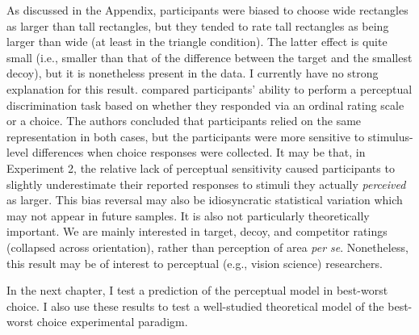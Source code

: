 As discussed in the Appendix, participants were biased to choose wide rectangles as larger than tall rectangles, but they tended to rate tall rectangles as being larger than wide (at least in the triangle condition). The latter effect is quite small (i.e., smaller than that of the difference between the target and the smallest decoy), but it is nonetheless present in the data. I currently have no strong explanation for this result. \textcite{gronau2023choice} compared participants' ability to perform a perceptual discrimination task based on whether they responded via an ordinal rating scale or a choice. The authors concluded that participants relied on the same representation in both cases, but the participants were more sensitive to stimulus-level differences when choice responses were collected. It may be that, in Experiment 2, the relative lack of perceptual sensitivity caused participants to slightly underestimate their reported responses to stimuli they actually \textit{perceived} as larger. This bias reversal may also be idiosyncratic statistical variation which may not appear in future samples. It is also not particularly theoretically important. We are mainly interested in target, decoy, and competitor ratings (collapsed across orientation), rather than perception of area \textit{per se}. Nonetheless, this result may be of interest to perceptual (e.g., vision science) researchers.

In the next chapter, I test a prediction of the perceptual model in best-worst choice. I also use these results to test a well-studied theoretical model of the best-worst choice experimental paradigm.
